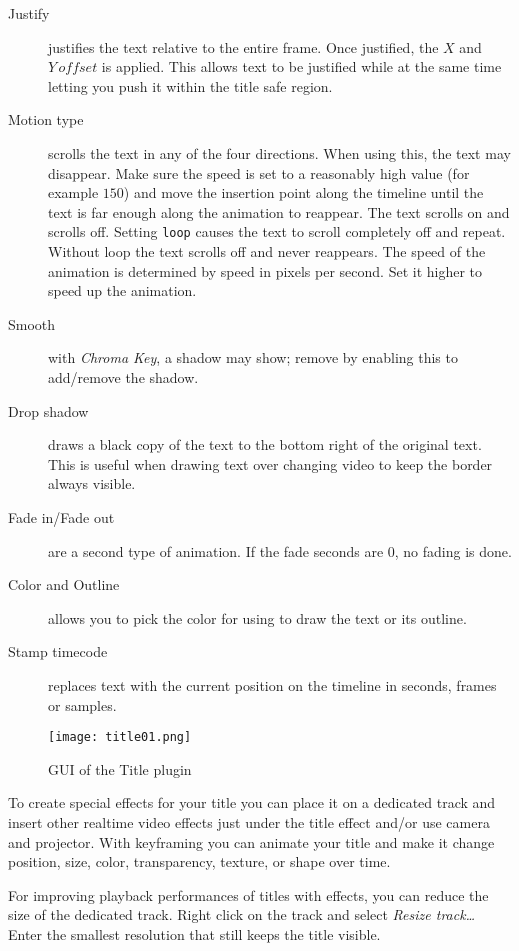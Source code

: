 \begin{description}
    \item[Justify] justifies the text relative to the entire frame. Once justified, the $X$ and $Y\, offset$ is applied. This allows text to be justified while at the same time letting you push it within the title safe region.
    \item[Motion type] scrolls the text in any of the four directions. When using this, the text may disappear. Make sure the speed is set to a reasonably high value (for example $150$) and move the insertion point along the timeline until the text is far enough along the animation to reappear. The text scrolls on and scrolls off. Setting \texttt{loop} causes the text to scroll completely off and repeat. Without loop the text scrolls off and never reappears. The speed of the animation is determined by speed in pixels per second. Set it higher to speed up the animation.
    \item[Smooth] with \textit{Chroma Key}, a shadow may show; remove by enabling this to add/remove the shadow.
    \item[Drop shadow] draws a black copy of the text to the bottom right of the original text. This is useful when drawing text over changing video to keep the border always visible.
    \item[Fade in/Fade out] are a second type of animation. If the fade seconds are $0$, no fading is done.
    \item[Color and Outline] allows you to pick the color for using to draw the text or its outline.
    \item[Stamp timecode] replaces text with the current position on the timeline in seconds, frames or samples.
\end{description}

\begin{figure}[hbtp]
    \centering
    \texttt{[image: title01.png]}
    \caption{GUI of the Title plugin}
    \label{fig:title01}
\end{figure}

To create special effects for your title you can place it on a dedicated track and insert other realtime video effects just under the title effect and/or use camera and projector. With keyframing you can animate your title and make it change position, size, color, transparency, texture, or shape over time.

For improving playback performances of titles with effects, you can reduce the size of the dedicated track. Right click on the track and select \textit{Resize track\dots} Enter the smallest resolution that still keeps the title visible.

